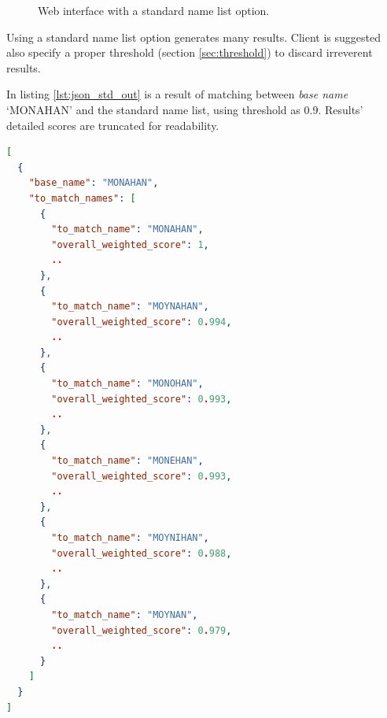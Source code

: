 \begin{figure}[H]
\centering
\captionsetup{justification=centering}
\caption{Web interface with a standard name list option.}
\label{fig:wi_std}
\end{figure}

Using a standard name list option generates many results.
Client is suggested also specify a proper threshold (section \ref{sec:threshold})
to discard irreverent results.

In listing \ref{lst:json_std_out} is a result of matching between
\emph{base name} `MONAHAN' and the standard name list, using threshold as 0.9.
Results' detailed scores are truncated for readability.

\begin{minipage}{\linewidth}
  \begin{lstlisting}[language={json}, label={lst:json_std_out}, caption={Results of matching \emph{base name} `MONAHAN' with a standard name list.}]
[
  {
    "base_name": "MONAHAN",
    "to_match_names": [
      {
        "to_match_name": "MONAHAN",
        "overall_weighted_score": 1,
        ..
      },
      {
        "to_match_name": "MOYNAHAN",
        "overall_weighted_score": 0.994,
        ..
      },
      {
        "to_match_name": "MONOHAN",
        "overall_weighted_score": 0.993,
        ..
      },
      {
        "to_match_name": "MONEHAN",
        "overall_weighted_score": 0.993,
        ..
      },
      {
        "to_match_name": "MOYNIHAN",
        "overall_weighted_score": 0.988,
        ..
      },
      {
        "to_match_name": "MOYNAN",
        "overall_weighted_score": 0.979,
        ..
      }
    ]
  }
]
\end{lstlisting}
\end{minipage}

